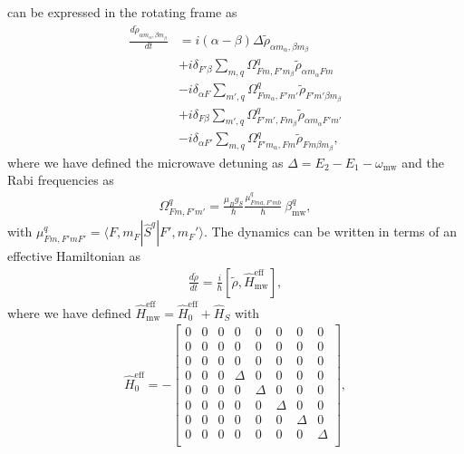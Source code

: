 \documentclass[%
reprint,
 amsmath,amssymb,
 aps,
floatfix,
]{revtex4-1}
\begin{document}
can be expressed in the rotating frame as
\begin{align}
\frac{d\tilde{\rho}_{\alpha m_\alpha,\beta m_\beta} }{dt}&=i(\alpha-\beta)\Delta\tilde{\rho}_{\alpha m_\alpha,\beta m_\beta}\nonumber\\
&+i\delta_{F'\beta}\sum_{m,q}\Omega_{Fm,F'm_\beta}^q\tilde{\rho}_{\alpha m_\alpha F m} \nonumber\\
&-i\delta_{\alpha F}\sum_{m',q}\Omega_{Fm_\alpha,F'm'}^q\tilde{\rho}_{F' m' \beta m_\beta} \nonumber\\
&+i\delta_{F\beta}\sum_{m',q}\Omega_{F'm',Fm_\beta}^q\tilde{\rho}_{\alpha m_\alpha F' m'} \nonumber\\
&-i\delta_{\alpha F'}\sum_{m,q}\Omega_{F'm_\alpha,Fm}^q\tilde{\rho}_{F m \beta m_\beta},
\end{align}
where we have defined the microwave detuning as $\Delta=E_2-E_1 - \omega_{\mathrm{mw}}$ and the Rabi frequencies as
\begin{align}
\Omega_{Fm,F'm'}^q=\frac{\mu_B g_S}{\hbar}\frac{\mu_{Fma,F'mb}^q}{\hbar}\ \beta_{\mathrm{mw}}^q,
\end{align}
with $\mu_{Fm,F'mF'}^q=\langle F, m_F|\hat{S}^q|F', m_F'\rangle$.
The dynamics can be written in terms of an effective Hamiltonian as
\begin{align}
\frac{d\tilde{\rho} }{dt}=\frac{i}{\hbar}[\tilde{\rho},\hat{H}_{\mathrm{mw}}^{\mathrm{eff}}],
\end{align}
where we have defined $\hat{H}_{\mathrm{mw}}^{\mathrm{eff}}=\hat{H}_{0}^{\mathrm{eff}}+\hat{H}_{S}$ with
\begin{align}
\hat{H}_{0}^{\mathrm{eff}}=-\begin{bmatrix}
    0 & 0 & 0 &0 & 0 & 0 &0 & 0  \\
    0 & 0 & 0 &0 & 0 & 0 &0 & 0 \\
    0 & 0 & 0 &0 & 0 & 0 &0 & 0 \\
    0 & 0 & 0 &\Delta&0 & 0 & 0 &0\\
    0 & 0 & 0 &0&\Delta & 0 & 0 &0\\
    0 & 0 & 0 &0&0 & \Delta & 0 &0\\
    0 & 0 & 0 &0&0 & 0 & \Delta &0\\
    0 & 0 & 0 &0&0 & 0 & 0 &\Delta\\
\end{bmatrix},
\end{align}
\end{document}

